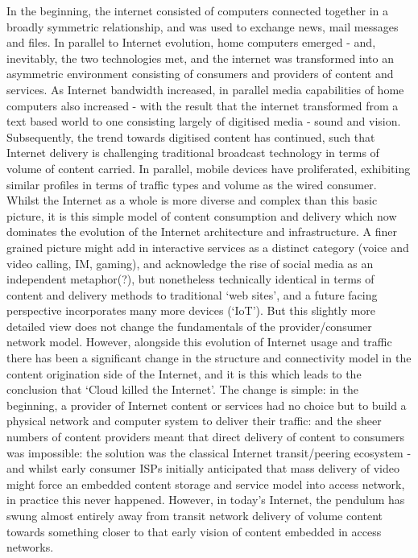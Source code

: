 In the beginning, the internet consisted of computers connected together in a broadly symmetric relationship, and was used to exchange news, mail messages and files.
In parallel to Internet evolution, home computers emerged - and, inevitably, the two technologies met, and the internet was transformed into an asymmetric environment consisting of consumers and providers of content and services.
As Internet bandwidth increased, in parallel media capabilities of home computers also increased - with the result that the internet transformed from a text based world to one consisting largely of digitised media - sound and vision.
Subsequently, the trend towards digitised content has continued, such that Internet delivery is challenging traditional broadcast technology in terms of volume of content carried. In parallel, mobile devices have proliferated, exhibiting similar profiles in terms of traffic types and volume as the wired consumer.
Whilst the Internet as a whole is more diverse and complex than this basic picture, it is this simple model of content consumption and delivery which now dominates the evolution of the Internet architecture and infrastructure.
A finer grained picture might add in interactive services as a distinct category (voice and video calling, IM, gaming), and acknowledge the rise of social media as an independent metaphor(?), but nonetheless technically identical in terms of content and delivery methods to traditional ‘web sites’, and a future facing perspective incorporates many more devices (‘IoT’).
But this slightly more detailed view
does not change the fundamentals of the provider/consumer network model.
However, alongside this evolution of Internet usage and traffic there has been a significant change in the structure and connectivity model in the content origination side of the Internet, and it is this which leads to the conclusion that ‘Cloud killed the Internet’.
The change is simple: in the beginning, a provider of Internet content or services had no choice but to build a physical network and computer system to deliver their traffic: and the sheer numbers of content providers meant that direct delivery of content to consumers was impossible: the solution was the classical Internet transit/peering ecosystem - and whilst early consumer ISPs initially anticipated that mass delivery of video might force an embedded content storage and service model into access network, in practice this never happened.
However, in today's Internet, the pendulum has swung almost entirely away from transit network delivery of volume content towards something closer to that early vision of content embedded in access networks.
